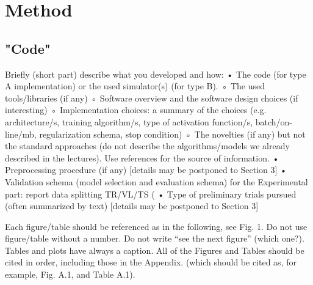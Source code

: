 \section{Method}

\subsection{"Code"}

Briefly (short part) describe what you developed and how:
• The code (for type A implementation) or the used simulator(s) (for type B). 
◦ The used tools/libraries (if any)
◦ Software overview and the software design choices (if interesting)
◦ Implementation choices: a  summary of the choices (e.g. architecture/s, training algorithm/s, type of activation function/s, batch/on-line/mb, regularization schema, stop condition)
◦ The novelties (if any) but not the standard approaches (do not describe the algorithms/models we already described in the lectures). Use references for the source of information. 
• Preprocessing procedure (if any) [details may be postponed to Section 3]
• Validation schema (model selection and evaluation schema) for the Experimental part: report data splitting  TR/VL/TS (%
• Type of preliminary trials pursued (often summarized by text) [details may be postponed to Section 3]



Each figure/table should be referenced as in the following, see Fig. 1. 
Do not use figure/table without a number. Do not write “see the next figure” (which one?).
Tables and plots have always a caption. All of the Figures and Tables should be cited in order, including those in the Appendix. (which should be cited as, for example, Fig. A.1, and Table A.1).